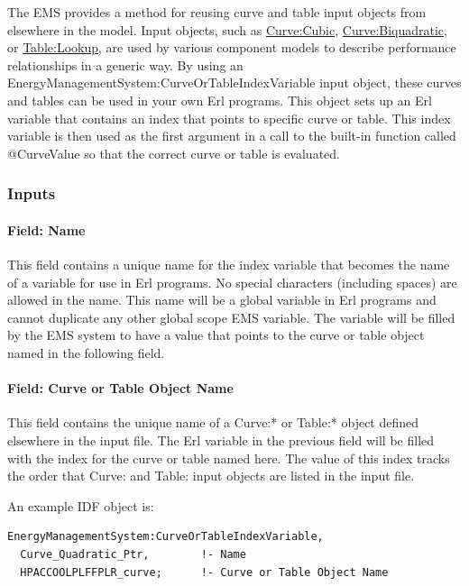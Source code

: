 The EMS provides a method for reusing curve and table input objects from elsewhere in the model. Input objects, such as \hyperref[curvecubic]{Curve:Cubic}, \hyperref[curvebiquadratic]{Curve:Biquadratic}, or \hyperref[tablelookup]{Table:Lookup}, are used by various component models to describe performance relationships in a generic way. By using an EnergyManagementSystem:CurveOrTableIndexVariable input object, these curves and tables can be used in your own Erl programs. This object sets up an Erl variable that contains an index that points to specific curve or table. This index variable is then used as the first argument in a call to the built-in function called @CurveValue so that the correct curve or table is evaluated.

\subsubsection{Inputs}\label{inputs-9-005}

\paragraph{Field: Name}\label{field-name-9-005}

This field contains a unique name for the index variable that becomes the name of a variable for use in Erl programs. No special characters (including spaces) are allowed in the name. This name will be a global variable in Erl programs and cannot duplicate any other global scope EMS variable. The variable will be filled by the EMS system to have a value that points to the curve or table object named in the following field.

\paragraph{Field: Curve or Table Object Name}\label{field-curve-or-table-object-name}

This field contains the unique name of a Curve:* or Table:* object defined elsewhere in the input file. The Erl variable in the previous field will be filled with the index for the curve or table named here. The value of this index tracks the order that Curve: and Table: input objects are listed in the input file.

An example IDF object is:

\begin{lstlisting}
EnergyManagementSystem:CurveOrTableIndexVariable,
  Curve_Quadratic_Ptr,        !- Name
  HPACCOOLPLFFPLR_curve;      !- Curve or Table Object Name
\end{lstlisting}

